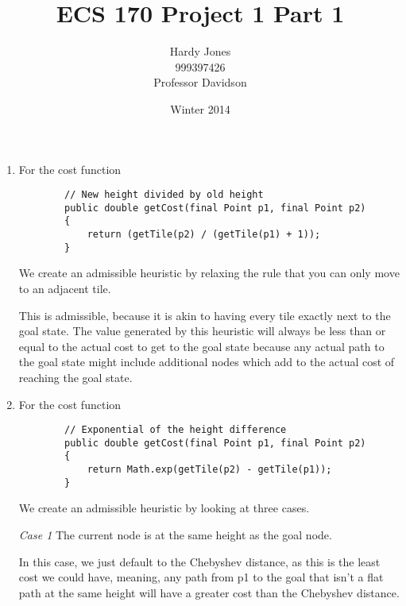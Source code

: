 \documentclass[12pt,letterpaper]{article}
\title{ECS 170 Project 1 Part 1\vspace{-2ex}}
\author{Hardy Jones\\
        999397426\\
        Professor Davidson\vspace{-2ex}}
\date{Winter 2014}
\begin{document}
  \maketitle




  \begin{enumerate}
    \item
      For the cost function
      \begin{lstlisting}
        // New height divided by old height
        public double getCost(final Point p1, final Point p2)
        {
            return (getTile(p2) / (getTile(p1) + 1));
        }
      \end{lstlisting}

      We create an admissible heuristic by relaxing the rule that you can only move to an adjacent tile.

      This is admissible, because it is akin to having every tile exactly next to the goal state.
      The value generated by this heuristic will always be less than or equal to
      the actual cost to get to the goal state because any actual path to the goal state might include additional nodes which add to the actual cost of reaching the goal state.

    \item
      For the cost function
      \begin{lstlisting}
        // Exponential of the height difference
        public double getCost(final Point p1, final Point p2)
        {
            return Math.exp(getTile(p2) - getTile(p1));
        }
      \end{lstlisting}

      We create an admissible heuristic by looking at three cases.

      \textit{Case 1} The current node is at the same height as the goal node.

      In this case, we just default to the Chebyshev distance, as this is the least cost we could have, meaning, any path from p1 to the goal that isn't a flat path at the same height will have a greater cost than the Chebyshev distance.


\end{enumerate}
\end{document}
